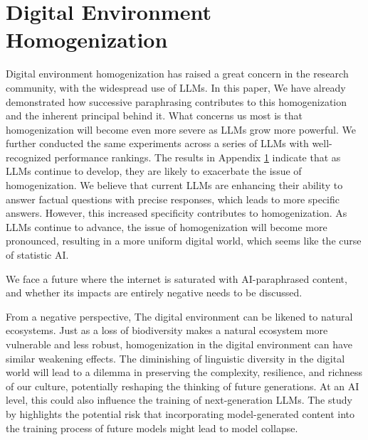 \section{Digital Environment Homogenization}
Digital environment homogenization has raised a great concern in the research community, with the widespread use of LLMs.
In this paper, We have already demonstrated how successive paraphrasing contributes to this homogenization and the inherent principal behind it.
What concerns us most is that homogenization will become even more severe as LLMs grow more powerful.
We further conducted the same experiments across a series of LLMs with well-recognized performance rankings. 
The results in Appendix \ref{} indicate that as LLMs continue to develop, they are likely to exacerbate the issue of homogenization.
We believe that current LLMs are enhancing their ability to answer factual questions with precise responses, which leads to more specific answers. 
However, this increased specificity contributes to homogenization. 
As LLMs continue to advance, the issue of homogenization will become more pronounced, resulting in a more uniform digital world, which seems like the curse of statistic AI.


We face a future where the internet is saturated with AI-paraphrased content, and whether its impacts are entirely negative needs to be discussed.


From a negative perspective, The digital environment can be likened to natural ecosystems. 
Just as a loss of biodiversity makes a natural ecosystem more vulnerable and less robust, homogenization in the digital environment can have similar weakening effects. 
The diminishing of linguistic diversity in the digital world will lead to a dilemma in preserving the complexity, resilience, and richness of our culture,  potentially reshaping the thinking of future generations. 
At an AI level, this could also influence the training of next-generation LLMs. 
The study by \citealt{} highlights the potential risk that incorporating model-generated content into the training process of future models might lead to model collapse.


